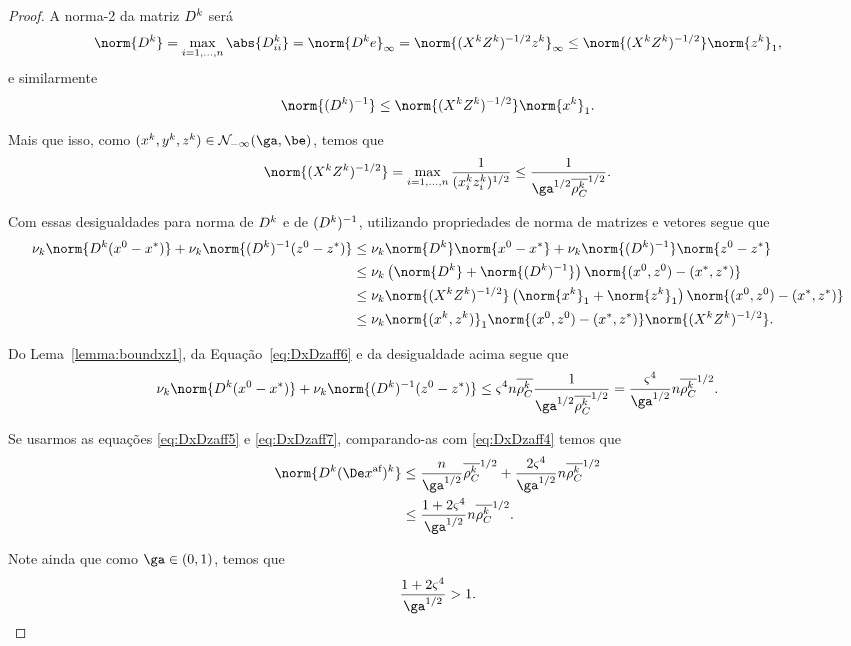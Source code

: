 \begin{proof}

A norma-2 da matriz  $D^{k}$ será
\[
 \norm{\Dk} = \max_{i=1,\ldots,n} \abs{\Dk_{ii}} = \norm{\Dk e}_{\infty} = \norm{(\Xk\Zk)^{-1/2}\zk}_{\infty} \leq \norm{(\Xk\Zk)^{-1/2}}\norm{\zk}_{1},
\]
e similarmente
\[
\norm{\Dik} \leq  \norm{(\Xk\Zk)^{-1/2}} \norm{\xk}_{1}.
\]

Mais que isso, como $(\xk,\yk,\zk)\in\Nset_{-\infty}(\ga,\be)$, temos que 
\begin{equation}
\label{eq:DxDzaff6}
	\norm{(\Xk\Zk)^{-1/2}} = \max_{i=1,\ldots,n}\frac{1}{(\xk_i\zk_i)^{1/2}} \leq \frac{1}{\ga^{1/2}\rhoCkb^{1/2}}.
\end{equation}

Com essas desigualdades para norma de $D^{k}$ e de $(D^{k})^{-1}$, utilizando propriedades de norma de matrizes e vetores segue que
\[
\begin{aligned}
 \nuk  \norm{\Dk(\xzero - \xstar)} + \nuk  \norm{\Dik(\zzero - \zstar)}  & \leq \nuk  \norm{\Dk}\norm{\xzero - \xstar} + \nuk  \norm{\Dik}\norm{\zzero - \zstar} \notag \\
 					& \leq \nuk \left(  \norm{\Dk} + \norm{\Dik}   \right)\norm{(\xzero,\zzero) - (\xstar,\zstar)} \\
 					& \leq \nuk  \norm{(\Xk\Zk)^{-1/2}} \left(  \norm{\xk}_{1}  +\norm{\zk}_{1}   \right)\norm{(\xzero,\zzero) - (\xstar,\zstar)} \\ 
 					& \leq  \nuk \norm{(\xk,\zk)}_{1}\norm{(\xzero,\zzero) - (\xstar,\zstar)}\norm{(\Xk\Zk)^{-1/2}}.
\end{aligned}
\]

Do Lema~\ref{lemma:boundxz1}, da Equação~\eqref{eq:DxDzaff6}  e da desigualdade acima segue que 
\begin{equation} \label{eq:DxDzaff7}
 \nuk  \norm{\Dk(\xzero - \xstar)} + \nuk  \norm{\Dik(\zzero - \zstar)}  \leq \bdxzstar^{4} n  \rhoCkb \frac{1}{\ga^{1/2}\rhoCkb ^{1/2}}  = \frac{\bdxzstar^{4}}{\ga^{1/2}}n \rhoCkb ^{1/2}.
\end{equation}

Se usarmos as equações \eqref{eq:DxDzaff5} e \eqref{eq:DxDzaff7}, comparando-as com \eqref{eq:DxDzaff4} temos que 
\[
\begin{aligned}
\norm{\Dk \dekx} & \leq \frac{n}{\ga^{1/2}}\rhoCkb ^{1/2} +  \frac{2\bdxzstar^{4}}{\ga^{1/2}}n \rhoCkb ^{1/2} \\
				& \leq \frac{1 + 2\bdxzstar^{4} }{\ga^{1/2}} n \rhoCkb ^{1/2}.
\end{aligned}
\]

Note ainda que  como  $\ga\in(0,1)$, temos que 
\begin{equation}
	\label{eq:boundDxDzaff-const}
	\frac{1 + 2\bdxzstar^{4} }{\ga^{1/2}} >1. \qedhere
\end{equation}
\end{proof}






